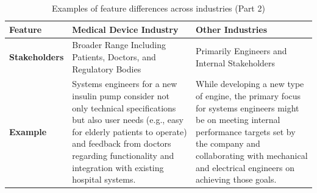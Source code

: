 \documentclass[conference]{IEEEtran}
\begin{document}
    \begin{table}[t]
    \caption{Examples of feature differences across industries (Part 2)}
    \label{tab:industry_features_part2}
    \centering
    \begin{tabular}{|p{2.5cm}|p{6.5cm}|p{6.5cm}|}
    \hline
    \textbf{Feature}         & \textbf{Medical Device Industry}                                                                                                                                                                                                                                                                                                                                                                               & \textbf{Other Industries}                                                                                                                                                                                                                                                                                                                                                                                                                                   \\ \hline
    \textbf{Stakeholders}    & Broader Range Including Patients, Doctors, and Regulatory Bodies                                                                                                                                                                                                                                                                                                                                               & Primarily Engineers and Internal Stakeholders                                                                                                                                                                                                                                                                                                                                                                                                               \\ \hline
    \textbf{Example}         & Systems engineers for a new insulin pump consider not only technical specifications but also user needs (e.g., easy for elderly patients to operate) and feedback from doctors regarding functionality and integration with existing hospital systems.                                                                                                                                                         & While developing a new type of engine, the primary focus for systems engineers might be on meeting internal performance targets set by the company and collaborating with mechanical and electrical engineers on achieving those goals.                                                                                                                                                                                                                     \\ \hline

\end{tabular}
\end{table}
\end{document}
